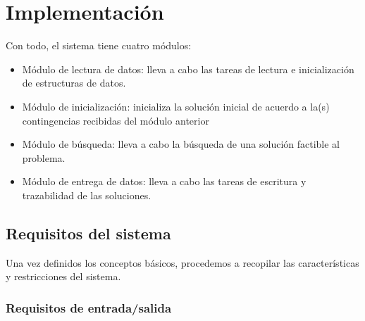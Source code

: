
\section{Implementación} \label{capitulo:4}




Con todo, el sistema tiene cuatro módulos:
\begin{itemize}
	\item Módulo de lectura de datos: lleva a cabo las tareas de lectura e inicialización de estructuras de datos.
	\item Módulo de inicialización: inicializa la solución inicial de acuerdo a la(s) contingencias recibidas del módulo anterior
	\item Módulo de búsqueda: lleva a cabo la búsqueda de una solución factible al problema.
	\item Módulo de entrega de datos: lleva a cabo las tareas de escritura y trazabilidad de las soluciones.
\end{itemize}



\subsection{Requisitos del sistema}
Una vez definidos los conceptos básicos, procedemos a recopilar las características y restricciones del sistema.

\subsubsection{Requisitos de entrada/salida}


